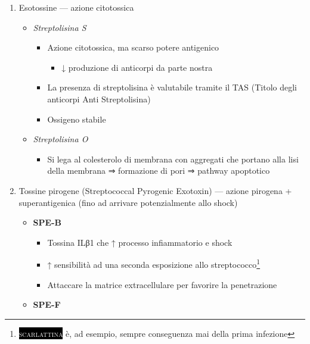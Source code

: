\documentclass[italian,]{article}
\providecommand{\tightlist}{%
  \setlength{\itemsep}{0pt}\setlength{\parskip}{0pt}}
\newcommand{\pat}[1]{\colorbox{black}{\textcolor{white}{\textsc{#1}}}}
\begin{document}
\begin{enumerate}
\def\labelenumi{\arabic{enumi}.}
\tightlist
\item
  Esotossine --- azione citotossica

  \begin{itemize}
  \tightlist
  \item
    \emph{Streptolisina S}

    \begin{itemize}
    \tightlist
    \item
      Azione citotossica, ma scarso potere antigenico

      \begin{itemize}
      \tightlist
      \item
        ↓ produzione di anticorpi da parte nostra
      \end{itemize}
    \item
      La presenza di streptolisina è valutabile tramite il TAS (Titolo
      degli anticorpi Anti Streptolisina)
    \item
      Ossigeno stabile
    \end{itemize}
  \item
    \emph{Streptolisina O}

    \begin{itemize}
    \tightlist
    \item
      Si lega al colesterolo di membrana con aggregati che portano alla
      lisi della membrana ⇒ formazione di pori ⇒ pathway apoptotico
    \end{itemize}
  \end{itemize}
\item
  Tossine pirogene (Streptococcal Pyrogenic Exotoxin) --- azione
  pirogena + superantigenica (fino ad arrivare potenzialmente allo
  shock)

  \begin{itemize}
  \tightlist
  \item
    \textbf{SPE-B}

    \begin{itemize}
    \tightlist
    \item
      Tossina ILβ1 che ↑ processo infiammatorio e shock
    \item
      ↑ sensibilità ad una seconda esposizione allo
      streptococco\footnote{\pat{scarlattina} è, ad esempio, sempre
        conseguenza mai della prima infezione}
    \item
      Attaccare la matrice extracellulare per favorire la penetrazione
    \end{itemize}
  \item
    \textbf{SPE-F}


\end{itemize}
\end{enumerate}
\end{document}
